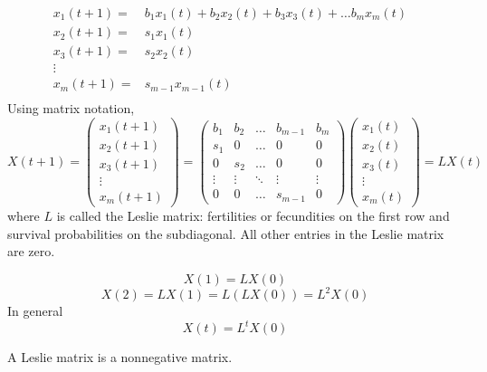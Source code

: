 \begin{subequations} 
\begin{align}
x_{1}(t+1)=& b_1 x_1(t)+b_2x_2(t)+b_3x_3(t)+\dots b_mx_m(t)\label{eq:Leslie1}\\
x_{2}(t+1)=&s_1 x_1(t)& \label{eq:Leslie2}\\
x_{3}(t+1)=&s_2 x_2(t)& \label{eq:Leslie3}\\
\vdots &\\
x_{m}(t+1)=&s_{m-1} x_{m-1}(t)& \label{eq:Leslie3}\\
\end{align}   
\end{subequations} 
Using matrix notation,
\begin{equation}
X(t+1)=\left (
\begin{array}{c}
x_1(t+1)\\
x_2(t+1)\\
x_3(t+1)\\
\vdots\\
x_m(t+1)
\end{array}
\right )
=
\left(
\begin{array}{ccccc}
b_1 & b_2 & \hdots & b_{m-1} & b_m\\
s_1 & 0  & \hdots & 0 & 0\\
0 & s_2  & \hdots & 0 & 0\\
\vdots & \vdots & \ddots & \vdots & \vdots \\
0 &0 &\hdots & s_{m-1} &0
\end{array}
\right)
\left (
\begin{array}{c}
x_1(t)\\
x_2(t)\\
x_3(t)\\
\vdots\\
x_m(t)
\end{array}
\right )=LX(t)
\end{equation}
where $L$ is called the Leslie matrix: fertilities or fecundities on the first row and survival probabilities on the subdiagonal. All other entries in the Leslie matrix are zero.



$$X(1)=LX(0)$$
$$X(2)=LX(1)=L\left(LX(0)\right)=L^2X(0)$$
In general
$$X(t)=L^tX(0)$$







\begin{definition}
A Leslie matrix is a nonnegative matrix.
\end{definition}




